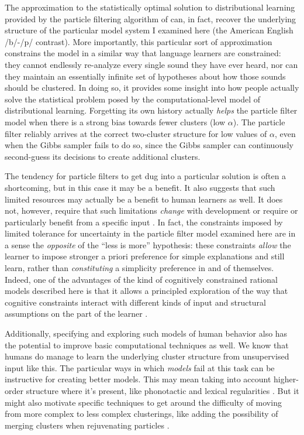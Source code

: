 \documentclass[10pt,letterpaper]{article}
\begin{document}
The approximation to the statistically optimal solution to
distributional learning provided by the particle filtering algorithm of
\textcite{Chen2000} can, in fact, recover the underlying structure of
the particular model system I examined here (the American English
/b/-/p/ contrast). More importantly, this particular sort of
approximation constrains the model in a similar way that language
learners are constrained: they cannot endlessly re-analyze every single
sound they have ever heard, nor can they maintain an essentially
infinite set of hypotheses about how those sounds should be clustered.
In doing so, it provides some insight into how people actually solve the
statistical problem posed by the computational-level model of
distributional learning. Forgetting its own history actually
\emph{helps} the particle filter model when there is a strong bias
towards fewer clusters (low \(\alpha\)). The particle filter reliably
arrives at the correct two-cluster structure for low values of
\(\alpha\), even when the Gibbs sampler fails to do so, since the Gibbs
sampler can continuously second-guess its decisions to create additional
clusters.

The tendency for particle filters to get dug into a particular solution
is often a shortcoming, but in this case it may be a benefit. It also
suggests that such limited resources may actually be a benefit to human
learners as well. It does not, however, require that such limitations
\emph{change} with development \autocite[as in][]{Newport1990} or
require or particularly benefit from a specific input \autocite[as
in][]{Elman1993}. In fact, the constraints imposed by limited tolerance
for uncertainty in the particle filter model examined here are in a
sense the \emph{opposite} of the \enquote{less is more} hypothesis:
these constraints \emph{allow} the learner to impose stronger a priori
preference for simple explanations and still learn, rather than
\emph{constituting} a simplicity preference in and of themselves.
Indeed, one of the advantages of the kind of cognitively constrained
rational models described here is that it allows a principled
exploration of the way that cognitive constraints interact with
different kinds of input and structural assumptions on the part of the
learner \autocites{Rohde1999}{Siegelman2015}.

Additionally, specifying and exploring such models of human behavior
also has the potential to improve basic computational techniques as
well. We know that humans do manage to learn the underlying cluster
structure from unsupervised input like this. The particular ways in
which \emph{models} fail at this task can be instructive for creating
better models. This may mean taking into account higher-order structure
where it's present, like phonotactic and lexical regularities
\autocite{Feldman2013}. But it might also motivate specific techniques
to get around the difficulty of moving from more complex to less complex
clusterings, like adding the possibility of merging clusters when
rejuvenating particles \autocite[analogously to reversible-jump
MCMC,][]{Green1995}.
\end{document}
